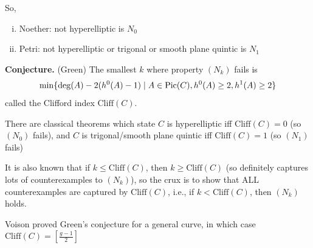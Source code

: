 \documentclass[12pt]{article}
\begin{document}
So,
\begin{enumerate}[(i)]
    \item Noether: not hyperelliptic is $N_0$
    \item Petri: not hyperelliptic or trigonal or smooth plane quintic is $N_1$
\end{enumerate}

\textbf{Conjecture.} (Green) The smallest $k$ where property $(N_k)$ fails is 
\[\min\{\deg(A)-2(h^0(A)-1) \mid A\in \mathrm{Pic}(C), h^0(A)\geq 2, h^1(A) \geq 2\}\]
called the Clifford index $\mathrm{Cliff}(C)$.

There are classical theorems which state $C$ is hyperelliptic iff $\mathrm{Cliff}(C)=0$ (so $(N_0)$ fails), and $C$ is trigonal/smooth plane quintic iff $\mathrm{Cliff}(C)=1$ (so $(N_1)$ fails)

It is also known that if $k \leq \mathrm{Cliff}(C)$, then $k\geq \mathrm{Cliff}(C)$ (so definitely captures lots of counterexamples to $(N_k)$), so the crux is to show that ALL counterexamples are captured by $\mathrm{Cliff}(C)$, i.e., if $k<\mathrm{Cliff}(C)$, then $(N_k)$ holds.

Voison proved Green's conjecture for a general curve, in which case $\mathrm{Cliff}(C) = \left[\frac{g-1}{2}\right]$


\nocite{*} %
\end{document}
